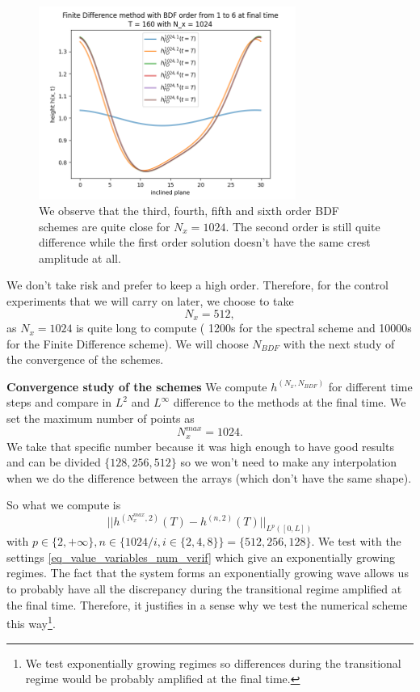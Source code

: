 \documentclass[12pt]{article}
\begin{document}
\begin{figure}[h]
\centering
\includegraphics[width=0.75\textwidth]{Verif_scheme/plot_FD_BDF_Nx_1024.png}
\caption{We observe that the third, fourth, fifth and sixth order BDF schemes are quite close for $N_x = 1024.$ The second order is still quite difference while the first order solution doesn't have the same crest amplitude at all. }
\label{fig:BDF_plot_1024}
\end{figure}


We don't take risk and prefer to keep a high order. Therefore, for the control experiments that we will carry on later, we choose to take 
\begin{equation}
\boxed{
    N_x=512
    },
\end{equation}
as $N_x=1024$ is quite long to compute ( 1200s for the spectral scheme and 10000s for the Finite Difference scheme). We will choose $N_{BDF}$ with the next study of the convergence of the schemes.

\textbf{Convergence study of the schemes}
We compute $h^{(N_x, N_{BDF})}$ for different time steps and compare in $L^2$ and $L^{\infty}$ difference to the methods at the final time. We set the maximum number of points as $$N_x^{max} = 1024.$$ We take that specific number because it was high enough to have good results and can be divided $\{128, 256, 512\}$ so we won't need to make any interpolation when we do the difference between the arrays (which don't have the same shape).
 
So what we compute is 
\begin{equation}\label{h_diff_convergence_rate}
    ||h^{(N_x^{max}, 2)}(T)-h^{(n, 2)}(T)||_{L^{p}([0,L])}
\end{equation}
with $p\in \{2, +\infty\},n\in \{1024/i, i\in \{2, 4, 8\}\} = \{512, 256, 128\}.$
We test with the settings \eqref{eq_value_variables_num_verif} which give an exponentially growing regimes. The fact that the system forms an exponentially growing wave allows us to probably have all the discrepancy during the transitional regime amplified at the final time. Therefore, it justifies in a sense why we test the numerical scheme this way\footnote{We test exponentially growing regimes so differences during the transitional regime would be probably amplified at the final time.}.
\\
\end{document}
